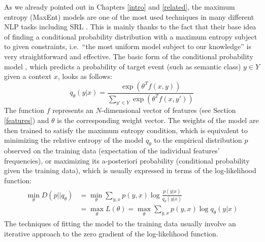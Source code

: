 \documentclass[12pt,notitlepage,a4paper]{report}
\begin{document}
As we already pointed out in Chapters \ref{intro} and \ref{related}, the maximum entropy (MaxEnt) models \citep[p.~219ff.]{jelinek97} are one of the most used techniques in many different NLP tasks \citep[p.~607f.]{manning00} including SRL \citep{jiang06,zhao09,che09,chen09}. This is mainly thanks to the fact that their base idea of finding a conditional probability distribution with a maximum entropy \citep[average uncertainty][p.~61]{manning00} subject to given constraints, i.e.\ ``the most uniform model subject to our knowledge'' \citep[p.~41]{berger96} is very straightforward and effective. The basic form of the conditional probability model \citep{malouf02}, which predicts a probability of target event (such as semantic class) $y\in Y$ given a context $x$, looks as follows:
\begin{equation}
q_\theta(y|x) = \frac{\exp(\theta^T f(x,y))}{\sum_{y'\in Y} \exp(\theta^T f(x,y'))}
\end{equation}
The function $f$ represents an $N$-dimensional vector of features (see Section \ref{features}) and $\theta$ is the corresponding weight vector. The weights of the model are then trained to satisfy the maximum entropy condition, which is equivalent to minimizing the relative entropy \citep[or Kullback-Leibler Divergence;][p.~72]{manning00} of the model $q_\theta$ to the empirical distribution $p$ observed on the training data (expectation of the individual features' frequencies), or maximizing its a-posteriori probability (conditional probability given the training data), which is usually expressed in terms of the log-likelihood function:
\begin{align}\label{eq:maxent}
\begin{split}
\min_\theta D(p||q_\theta) & = \min_\theta \sum_{y,x} p(y,x) \log\frac{p(y|x)}{q_\theta(y|x)} \\
& = \max_\theta L(\theta) = \max_\theta \sum_{y,x} p(y,x) \log q_\theta(y|x) 
\end{split}
\end{align}
The techniques of fitting the model to the training data usually involve an iterative approach to the zero gradient of the log-likelihood function.
\end{document}
